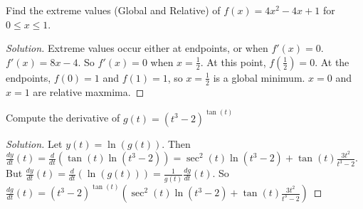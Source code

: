 \documentclass[crop=false,class=book,oneside]{standalone}
\begin{document}
\begin{problem}
Find the extreme values (Global and Relative) of $f(x)=4x^{2}-4x+1$ for $0\leq x\leq 1$.
\end{problem}
\begin{proof}[Solution]
Extreme values occur either at endpoints, or when $f'(x)=0$. $f'(x)=8x-4$. So $f'(x)=0$ when $x=\frac{1}{2}$. At this point, $f(\frac{1}{2})=0$. At the endpoints, $f(0)=1$ and $f(1)=1$, so $x=\frac{1}{2}$ is a global minimum. $x=0$ and $x=1$ are relative maxmima.
\end{proof}
\begin{problem}
Compute the derivative of $g(t)=(t^{3}-2)^{\tan(t)}$
\end{problem}
\begin{proof}[Solution]
Let $y(t)=\ln(g(t))$. Then $\frac{dy}{dt}(t)=\frac{d}{dt}(\tan(t)\ln(t^{3}-2))=\sec^{2}(t)\ln(t^{3}-2)+\tan(t)\frac{3t^{2}}{t^{3}-2}$. But $\frac{dy}{dt}(t)=\frac{d}{dt}(\ln(g(t)))=\frac{1}{g(t)}\frac{dg}{dt}(t)$. So $\frac{dg}{dt}(t)=(t^{3}-2)^{\tan(t)}(\sec^{2}(t)\ln(t^{3}-2)+\tan(t)\frac{3t^{2}}{t^{3}-2})$
\end{proof}
\ifx\ifmain\undefined
    \clearpage
    \printglossary[type=\acronymtype]
    \clearpage
    \printglossary[style=long]
    \clearpage
\fi
\end{document}

